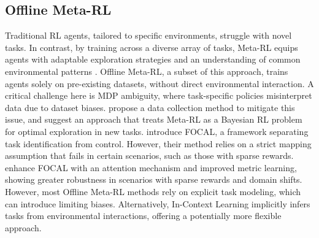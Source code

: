 \documentclass{article}
\theoremstyle{plain}
\theoremstyle{definition}
\theoremstyle{remark}
\begin{document}
\subsection{Offline Meta-RL}
Traditional RL agents, tailored to specific environments, struggle with novel tasks. In contrast, by training across a diverse array of tasks, Meta-RL equips agents with adaptable exploration strategies and an understanding of common environmental patterns \citep{duan2016rl, wang2016learning, rajeswaran2017towards, zhang2018dissection, team2021open, nikulin2023xlandminigrid}. Offline Meta-RL, a subset of this approach, trains agents solely on pre-existing datasets, without direct environmental interaction. A critical challenge here is MDP ambiguity, where task-specific policies misinterpret data due to dataset biases. \citet{dorfman2021offline} propose a data collection method to mitigate this issue, and suggest an approach that treats Meta-RL as a Bayesian RL problem for optimal exploration in new tasks. \citet{li2020focal} introduce FOCAL, a framework separating task identification from control. However, their method relies on a strict mapping assumption that fails in certain scenarios, such as those with sparse rewards. \citet{li2021provably} enhance FOCAL with an attention mechanism and improved metric learning, showing greater robustness in scenarios with sparse rewards and domain shifts. However, most Offline Meta-RL methods rely on explicit task modeling, which can introduce limiting biases. Alternatively, In-Context Learning implicitly infers tasks from environmental interactions, offering a potentially more flexible approach.
\end{document}
